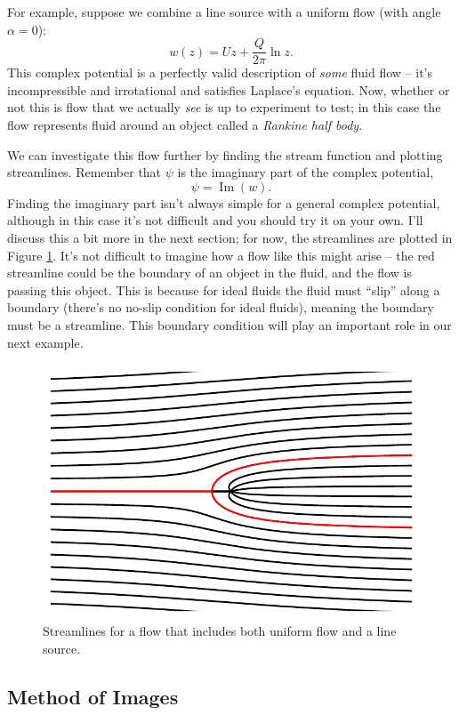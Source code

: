 For example, suppose we combine a line source with a uniform flow (with angle $\alpha = 0$):
\[
w(z) = Uz + \frac{Q}{2\pi} \ln z.
\]
This complex potential is a perfectly valid description of \emph{some} fluid flow -- it's incompressible and irrotational and satisfies Laplace's equation.  Now, whether or not this is flow that we actually \emph{see} is up to experiment to test; in this case the flow represents fluid around an object called a \emph{Rankine half body}.

We can investigate this flow further by finding the stream function and plotting streamlines.  Remember that $\psi$ is the imaginary part of the complex potential,
\[
\psi = \operatorname{Im}(w).
\]
Finding the imaginary part isn't always simple for a general complex potential, although in this case it's not difficult and you should try it on your own.  I'll discuss this a bit more in the next section; for now, the streamlines are plotted in Figure \ref{fig_uniform_source}.  It's not difficult to imagine how a flow like this might arise -- the red streamline could be the boundary of an object in the fluid, and the flow is passing this object.  This is because for ideal fluids the fluid must ``slip'' along a boundary (there's no no-slip condition for ideal fluids), meaning the boundary must be a streamline.  This boundary condition will play an important role in our next example.

\begin{figure}
\centering\includegraphics[width=0.7\linewidth]{Figures/Chapter4/fig_uniform_source}
\caption{Streamlines for a flow that includes both uniform flow and a line source.}
\label{fig_uniform_source}
\end{figure}



\subsection{Method of Images}
\label{sec_images}


